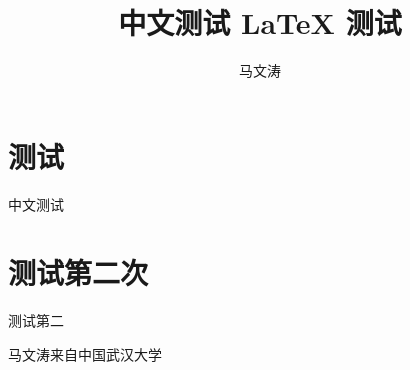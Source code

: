 \documentclass{ctexart}
\newcommand{\wuda}{中国武汉大学}
\begin{document}
\title{中文测试 \LaTeX{} 测试}
\author{马文涛}
\maketitle
\tableofcontents
\section{测试}
中文测试
\section{测试第二次}
测试第二

马文涛来自\wuda
\end{document}
